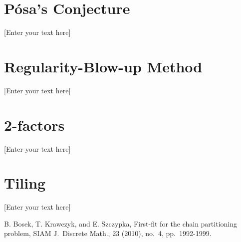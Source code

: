 \documentclass[oneside,12pt]{memoir}
\begin{document}
\chapter{P\'osa's Conjecture}

\DoubleSpacing
\setlength{\parindent}{.5in}
[Enter your text here]

\chapter{Regularity-Blow-up Method} 

\DoubleSpacing
\setlength{\parindent}{.5in}
[Enter your text here]

\chapter{2-factors}

\DoubleSpacing
\setlength{\parindent}{.5in}
[Enter your text here]

\chapter{Tiling}

\DoubleSpacing
\setlength{\parindent}{.5in}
[Enter your text here]



\clearpage


\newpage
 


\begin{thebibliography}{99}
\SingleSpacing


B. Bosek, T. Krawczyk, and E. Szczypka, 
First-fit for the chain partitioning problem,
SIAM J.\ Discrete Math., 23 (2010), no.\ 4, pp.\ 1992-1999.


\end{thebibliography}










\end{document}
